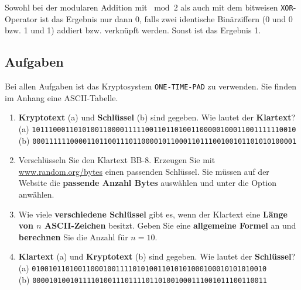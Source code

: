 \begin{important}
	Sowohl bei der modularen Addition mit $\bmod 2$ als auch mit dem bitweisen \texttt{XOR}-Operator ist das Ergebnis nur dann 0, falls zwei identische Binärziffern (0 und 0 bzw. 1 und 1) addiert bzw. verknüpft werden. Sonst ist das Ergebnis 1.
\end{important}

\newpage

\subsection{Aufgaben}

Bei allen Aufgaben ist das Kryptosystem \texttt{ONE-TIME-PAD} zu verwenden. Sie finden im Anhang eine \ac{ASCII}-Tabelle.

\begin{enumerate}

\item \textbf{Kryptotext} (a) und \textbf{Schlüssel} (b) sind gegeben. Wie lautet der \textbf{Klartext}?\\ 
(a) \texttt{101110001101010011000011111001101101001100000100011001111110010}\\ 
(b) \texttt{000111111000011011001110110000101100011011100100101101010100001}


\fillwithgrid{1in}

\item Verschlüsseln Sie den Klartext BB-8. Erzeugen Sie mit \url{www.random.org/bytes} einen passenden Schlüssel. Sie müssen auf der Website die \textbf{passende Anzahl Bytes} auswählen und unter  die Option \textbf{} anwählen.

\fillwithgrid{1.5in}

\item Wie viele \textbf{verschiedene Schlüssel} gibt es, wenn der Klartext eine \textbf{Länge von $n$ \ac{ASCII}-Zeichen} besitzt. Geben Sie eine\textbf{ allgemeine Formel} an und \textbf{berechnen} Sie die Anzahl für $n = 10$.

\fillwithgrid{2in}

\item \textbf{Klartext} (a) und \textbf{Kryptotext} (b) sind gegeben. Wie lautet der \textbf{Schlüssel}?\\
(a) \texttt{01001011010011000100111101010011010101000100010101010010} \\
(b) \texttt{00001010010111101001110111101101001000111001011100110011}


\end{enumerate}
